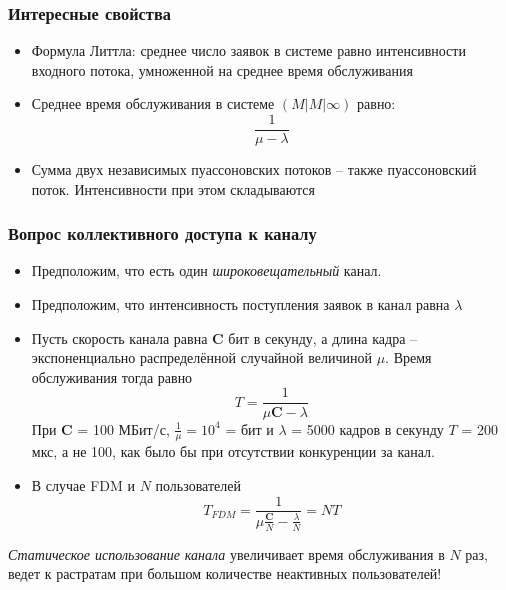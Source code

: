 \documentclass[utf8]{beamer}
\begin{document}
\begin{frame}
\frametitle{Интересные свойства}
\begin{itemize}
	\item Формула Литтла: среднее число заявок в системе равно интенсивности входного потока, умноженной на среднее время обслуживания
	\item Среднее время обслуживания в системе $(M|M|\infty)$ равно: $$\frac{1}{\mu - \lambda}$$
	\item Сумма двух независимых пуассоновских потоков -- также пуассоновский поток. Интенсивности при этом складываются
\end{itemize}
\end{frame}
\begin{frame}
\frametitle{Вопрос коллективного доступа к каналу}
\begin{itemize}
	\item Предположим, что есть один \emph{широковещательный} канал.
	\item Предположим, что интенсивность поступления заявок в канал равна $\lambda$
	\item Пусть скорость канала равна $\mathbf{C}$ бит в секунду, а длина кадра -- экспоненциально распределённой случайной величиной $\mu$. Время обслуживания тогда равно
	$$
	T = \frac{1}{\mu \mathbf{C} - \lambda}
	$$
	{
	\color{red}
	\tiny При $\mathbf{C}$ = 100 МБит/с, $\frac{1}{\mu} = 10^4$ = бит и $\lambda$ = 5000 кадров в секунду $T$ = 200 мкс, а не 100, как было бы при отсутствии конкуренции за канал.
	}
	\item В случае FDM и $N$ пользователей
	$$
	T_{FDM} = \frac{1}{\mu\frac{\mathbf{C}}{N} - \frac{\lambda}{N}} = NT
	$$ 
\end{itemize}
\emph{Статическое использование канала} увеличивает время обслуживания в $N$ раз, ведет к растратам при большом количестве неактивных пользователей!
\end{frame}
\end{document}
